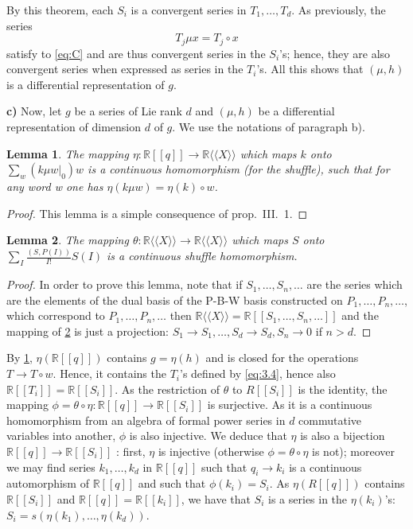 \documentclass[a4paper,12pt]{article}
\newtheorem{lemma}{Lemma}
\newcommand{\R}{\mathbb{R}}
\newcommand{\Rxx}{\R\langle\langle X\rangle\rangle}
\begin{document}
By this theorem, each $S_i$ is a convergent series in ${T}_1, \ldots, T_d$. As previously, the series
\begin{equation*}
	T_j \mu x=T_j \circ x
\end{equation*}
satisfy to \eqref{eq:C} and are thus convergent series in the $S_i$'s; hence, they are also convergent series when expressed as series in the ${T}_i$'s. All this shows that $(\mu, {h})$ is a differential representation of ${g}$.

\bigskip

\textbf{c)} Now, let $g$ be a series of Lie rank $d$ and $(\mu, h)$ be a differential representation of dimension $d$ of $g$. We use the notations of paragraph b).

\begin{lemma} \label{l:6}
	The mapping $\eta: \R[[{q}]] \rightarrow \Rxx$ which maps ${k}$ onto $\sum_{{w}}\left(\left.{k} \mu {w}\right|_0\right) {w}$ is a
	continuous homomorphism (for the shuffle), such that for any word w one has $\eta(k \mu w)=\eta(k) \circ w$.
\end{lemma}

\begin{proof}
	This lemma is a simple consequence of \cite{4} prop.\ III.\ 1.
\end{proof}

\begin{lemma} \label{l:7}
	The mapping $\theta: \Rxx \to \Rxx$ which maps $S$ onto $\sum_I \frac{(S, P(I))}{I !} S(I)$
	is a continuous shuffle homomorphism.
\end{lemma}

\begin{proof}
	In order to prove this lemma, note that if $S_1, \ldots, S_n, \ldots$ are the series which are the elements of the dual basis of the P-B-W basis constructed on $P_1, \ldots, P_n, \ldots$, which correspond to $P_1, \ldots, P_n, \ldots$ then $\Rxx =\R [[S_1, \ldots, S_n, \ldots]]$ and the mapping of \cref{l:7} is just a projection: $S_1 \rightarrow S_1, \ldots, S_{{d}} \rightarrow S_{{d}}, S_{{n}} \rightarrow 0$ if ${n}>{d}$.
\end{proof}

By \cref{l:6}, $\eta(\R[[q]])$ contains $g=\eta(h)$ and is closed for the operations ${T} \rightarrow {T} \circ {w}$. 
Hence, it contains the ${T}_i$'s defined by \eqref{eq:3.4}, hence also $\R[[T_i]]=\R[[S_i]]$.
As the restriction of $\theta$ to ${R}\left[\left[{S}_i\right]\right]$ is the identity, the mapping $\phi=\theta \circ \eta: \R[[q]] \to \R[[S_i]]$ is surjective. 
As it is a continuous homomorphism from an algebra of formal power series in $d$ commutative variables into another, $\phi$ is also injective.
We deduce that $\eta$ is also a bijection $\R[[q]] \to \R[[S_i]]$ : first, $\eta$ is injective (otherwise $\phi=\theta \circ \eta$ is not); moreover we may find series $k_1, \ldots, k_d$ in $\R[[q]]$ such that $q_i \to k_i$ is a continuous automorphism of $\R[[q]]$ and such that $\phi\left(k_i\right)=S_i$. 
As $\eta(R[[q]])$ contains $\R[[S_i]]$ and $\R[[q]]=\R[[k_i]]$, we have that $S_i$ is a series in the $\eta\left(k_i\right)$'s: $S_i = s(\eta(k_1), \dotsc, \eta(k_d))$.
\end{document}
